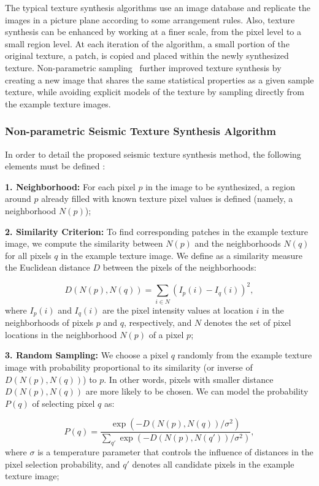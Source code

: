 ﻿\documentclass{ieeeaccess}
\begin{document}
The typical texture synthesis algorithms use an image database and replicate the images in a picture plane according to some arrangement rules. Also, texture synthesis can be enhanced by working at a finer scale, from the pixel level to a small region level. At each iteration of the algorithm, a small portion of the original texture, a patch, is copied and placed within the newly synthesized texture. Non-parametric sampling~\cite{Efros1999} further improved texture synthesis by creating a new image that shares the same statistical properties as a given sample texture, while avoiding explicit models of the texture by sampling directly from the example texture images.


\subsubsection{Non-parametric Seismic Texture Synthesis Algorithm}

In order to detail the proposed seismic texture synthesis method, the following elements must be defined :

\textbf{1. Neighborhood:} For each pixel $p$ in the image to be synthesized, a region around $p$ already filled with known texture pixel values is defined (namely, a neighborhood $N(p)$);

\textbf{2. Similarity Criterion:} To find corresponding patches in the example texture image, we compute the similarity between $N(p)$ and the neighborhoods $N(q)$ for all pixels $q$ in the example texture image. We define as a similarity measure the Euclidean distance $D$ between the pixels of the neighborhoods:

\begin{equation}
D(N(p), N(q)) = \sum_{i \in N} \left( I_p(i) - I_q(i) \right)^2,
\end{equation}
where $I_p(i)$ and $I_q(i)$ are the pixel intensity values at location $i$ in the neighborhoods of pixels $p$ and $q$, respectively, and $N$ denotes the set of pixel locations in the neighborhood $N(p)$ of a pixel $p$;

\textbf{3. Random Sampling:} We choose a pixel $q$ randomly from the example texture image with probability proportional to its similarity (or inverse of $D(N(p), N(q))$) to $p$. In other words, pixels with smaller distance $D(N(p), N(q))$ are more likely to be chosen. We can model the probability $P(q)$ of selecting pixel $q$ as:

\begin{equation}
P(q) = \frac{\exp(-D(N(p), N(q)) / \sigma^2)}{\sum_{q'} \exp(-D(N(p), N(q')) / \sigma^2)},
\end{equation}
where $\sigma$ is a temperature parameter that controls the influence of distances in the pixel selection probability, and $q'$ denotes all candidate pixels in the example texture image;
\end{document}

